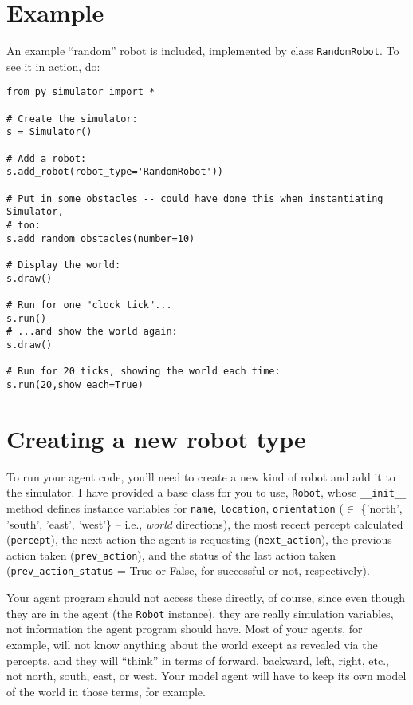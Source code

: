 \documentclass[11pt]{tufte-handout}
\begin{document}
\section{Example}
\label{sec:org748cccc}
An example ``random'' robot is included, implemented by class \texttt{RandomRobot}.  To see it in action, do:
\begin{verbatim}
from py_simulator import *

# Create the simulator:
s = Simulator()

# Add a robot:
s.add_robot(robot_type='RandomRobot'))

# Put in some obstacles -- could have done this when instantiating Simulator,
# too:
s.add_random_obstacles(number=10)

# Display the world:
s.draw()

# Run for one "clock tick"...
s.run()
# ...and show the world again:
s.draw()

# Run for 20 ticks, showing the world each time:
s.run(20,show_each=True)
\end{verbatim}

\section{Creating a new robot type}
\label{sec:org8f08ea5}

To run your agent code, you'll need to create a new kind of robot and add it to the simulator.  I have provided a base class for you to use, \texttt{Robot}, whose \texttt{\_\_init\_\_} method defines instance variables for \texttt{name}, \texttt{location}, \texttt{orientation} (\(\in\) \{'north', 'south', 'east', 'west'\} -- i.e., \emph{world} directions), the most recent percept calculated (\texttt{percept}), the next action the agent is requesting (\texttt{next\_action}), the previous action taken (\texttt{prev\_action}), and the status of the last action taken (\texttt{prev\_action\_status} = True or False, for successful or not, respectively).

Your agent program should not access these directly, of course, since even though they are in the agent (the \texttt{Robot} instance), they are really simulation variables, not information the agent program should have.  Most of your agents, for example, will not know anything about the world except as revealed via the percepts, and they will ``think'' in terms of forward, backward, left, right, etc., not north, south, east, or west.  Your model agent will have to keep its own model of the world in those terms, for example.  
\end{document}
